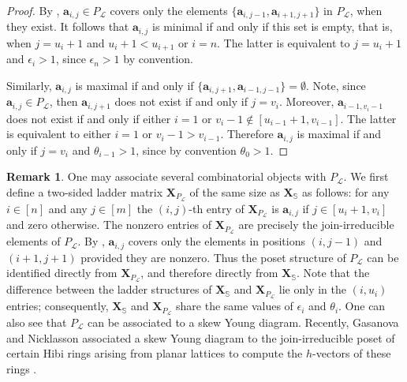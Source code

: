 \documentclass[11pt,a4paper,reqno,dvipsnames]{amsart}
\theoremstyle{plain}
\theoremstyle{definition}
\newtheorem{Assumptions and Discussion}[Theorem]{Assumptions and Discussion}
\newtheorem{Remark}[Theorem]{Remark}
\theoremstyle{remark}
\newcommand\bda{{\bm a}}
\newcommand\bfX{\mathbf{X}}
\newcommand\bfS{\mathbb{S}}
\newcommand\calL{\mathcal{L}}
\begin{document}
\begin{proof}
By ,  $\bda_{i,j} \in P_{\calL}$ covers only the elements $\{ \bda_{i,j-1}, \bda_{i+1, j +1}\}$ in $P_{\calL}$, when they exist.  It follows that $\bda_{i,j}$ is minimal if and only if this set is empty, that is, when
 $j=u_i+1$ and $u_i+1<u_{i+1}$ or $i=n$. The latter is equivalent to $j=u_i+1$ and $\epsilon_i>1$, since $\epsilon_n>1$ by convention. 

Similarly, $\bda_{i,j}$ is maximal if and only if $\{ \bda_{i,j+1}, \bda_{i-1, j -1}\}=\emptyset$.
Note, since $\bda_{i,j} \in P_{\calL}$, then $\bda_{i,j+1}$ does not exist if and only if $j = v_i$. Moreover, $\bda_{i-1,v_i-1}$ does not exist if and only if either $i=1$ or $v_i-1\not\in[u_{i-1}+1, v_{i-1}]$.
The latter is equivalent to either $i=1$ or $v_i-1>v_{i-1}$. 
Therefore $\bda_{i,j}$ is maximal if and only if $j =v_i$ and  $\theta_{i-1} >1$, since by convention $\theta_0>1$. 
\end{proof}

\begin{Remark} \label{M}
One may associate several combinatorial objects with $P_{\calL}$. We first define a two-sided ladder matrix $\bfX_{P_{\calL}}$ of the same size as $\bfX_{\bfS}$ as follows: for any $i\in [n]$ and any $j\in [m]$ the $(i,j)$-th entry of $\bfX_{P_{\calL}}$ is $\bda_{i,j}$ if $j\in [u_i+1, v_i]$ and zero otherwise. The nonzero entries of $\bfX_{P_{\calL}}$ are precisely the join-irreducible elements of $P_{\calL}$. By , $\bda_{i,j}$ covers only the elements in positions $(i,j-1)$ and $(i+1, j+1)$ provided they are nonzero. Thus the poset structure of $P_{\calL}$ can be identified directly from $\bfX_{P_{\calL}}$, and therefore directly from $\bfX_{\bfS}$. 
Note that the difference between the ladder structures of $\bfX_{\bfS}$ and $\bfX_{P_{\calL}}$ lie only in the $(i, u_i)$ entries; consequently,  $\bfX_{\bfS}$ and $\bfX_{P_{\calL}}$ share the same values of $\epsilon_i$ and $\theta_i$. One can also see that $P_{\calL}$ can be associated to a skew Young diagram. Recently, Gasanova and Nicklasson associated a skew Young diagram to the join-irreducible poset of certain Hibi rings arising from planar lattices to compute the $h$-vectors of these rings \cite{GasanovaNicklasson2024}.
\end{Remark}
\end{document}
